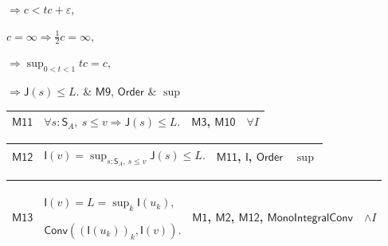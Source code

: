 \documentclass[11pt]{amsart}
\newlength{\FTCFourColumnBody}
\begin{document}
{\begin{tabular}
$\displaystyle \Rightarrow c<tc+\varepsilon,$\par
$\displaystyle c=\infty\Rightarrow\tfrac12c=\infty,$\par
$\displaystyle \Rightarrow\sup_{0<t<1}tc=c,$\par
$\displaystyle \Rightarrow\textsf{J}(s)\le L.$ & \hyperlink{proof:M9}{$\displaystyle \textsf{M9}$}, \hyperlink{ax:Order}{$\displaystyle \textsf{Order}$} & $\displaystyle \sup$\\ \hline
\end{tabular}%
\par\setlength{\parskip}{0pt}\nointerlineskip
\noindent
\begin{tabular}{|@{}>{\centering\arraybackslash}m{0.078431\FTCFourColumnBody}|>{\centering\arraybackslash}m{0.535947\FTCFourColumnBody}|>{\centering\arraybackslash}m{0.281045\FTCFourColumnBody}|>{\centering\arraybackslash}m{0.104575\FTCFourColumnBody}|}\hline
\hypertarget{proof:M11}{$\displaystyle \textsf{M11}$} & $\displaystyle \forall s:\textsf{S}_A,\ s\le v\Rightarrow\textsf{J}(s)\le L.$ & \hyperlink{proof:M3}{$\displaystyle \textsf{M3}$}, \hyperlink{proof:M10}{$\displaystyle \textsf{M10}$} & $\displaystyle \forall I$\\ \hline
\end{tabular}%
\par\setlength{\parskip}{0pt}\nointerlineskip
\noindent
\begin{tabular}{|@{}>{\centering\arraybackslash}m{0.078431\FTCFourColumnBody}|>{\centering\arraybackslash}m{0.535947\FTCFourColumnBody}|>{\centering\arraybackslash}m{0.281045\FTCFourColumnBody}|>{\centering\arraybackslash}m{0.104575\FTCFourColumnBody}|}\hline
\hypertarget{proof:M12}{$\displaystyle \textsf{M12}$} & $\displaystyle \textsf{I}(v)=\sup_{s:\textsf{S}_A,\ s\le v}\textsf{J}(s)\le L.$ & \hyperlink{proof:M11}{$\displaystyle \textsf{M11}$}, \hyperlink{def:I}{$\displaystyle \textsf{I}$}, \hyperlink{ax:Order}{$\displaystyle \textsf{Order}$} & $\displaystyle \sup$\\ \hline
\end{tabular}%
\par\setlength{\parskip}{0pt}\nointerlineskip
\noindent
\begin{tabular}{|@{}>{\centering\arraybackslash}m{0.078431\FTCFourColumnBody}|>{\centering\arraybackslash}m{0.535947\FTCFourColumnBody}|>{\centering\arraybackslash}m{0.281045\FTCFourColumnBody}|>{\centering\arraybackslash}m{0.104575\FTCFourColumnBody}|}\hline
\hypertarget{proof:M13}{$\displaystyle \textsf{M13}$} & $\displaystyle \textsf{I}(v)=L=\sup_k\textsf{I}(u_k),$\par
$\displaystyle \textsf{Conv}((\textsf{I}(u_k))_k,\textsf{I}(v)).$ & \hyperlink{proof:M1}{$\displaystyle \textsf{M1}$}, \hyperlink{proof:M2}{$\displaystyle \textsf{M2}$}, \hyperlink{proof:M12}{$\displaystyle \textsf{M12}$}, \hyperlink{lem:MonoIntegralConv}{$\displaystyle \textsf{MonoIntegralConv}$} & $\displaystyle \land I$\\ \hline
\end{tabular}%
\par
}
\end{document}
